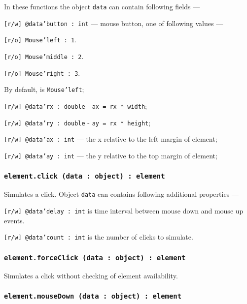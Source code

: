 In these functions the object \texttt{data} can contain following fields —
\begin{icItems}
    \item \texttt{[r/w] @data'button : int} — mouse button, one of following values —
	\begin{icItems}
	    \item \texttt{[r/o] Mouse'left : 1}.
		\item \texttt{[r/o] Mouse'middle : 2}.
		\item \texttt{[r/o] Mouse'right : 3}.
	\end{icItems}
	By default, is \texttt{Mouse'left};
	\item \texttt{[r/w] @data'rx : double} - \texttt{ax = rx * width};
	\item \texttt{[r/w] @data'ry : double} - \texttt{ay = rx * height};
	\item \texttt{[r/w] @data'ax : int} — the x relative to the left margin of element;
	\item \texttt{[r/w] @data'ay : int} — the y relative to the top margin of element;
\end{icItems}

\subsubsection{\texttt{element.click (data : object) : element}}

Simulates a click. Object \texttt{data} can contains following additional properties —
\begin{icItems}
	\item \texttt{[r/w] @data'delay : int} is time interval between mouse down and mouse up events.
	\item \texttt{[r/w] @data'count : int} is the number of clicks to simulate.
\end{icItems}

\subsubsection{\texttt{element.forceClick (data : object) : element}}

Simulates a click without checking of element availability.

\subsubsection{\texttt{element.mouseDown (data : object) : element}}

